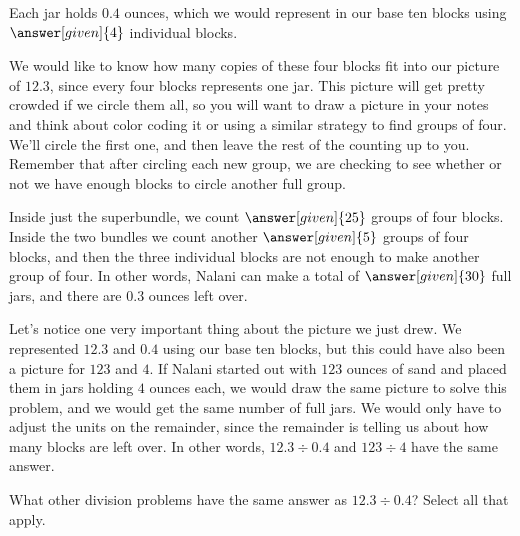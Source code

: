 \documentclass{ximera}
\begin{document}
\begin{example}
\begin{image}
\end{image}
Each jar holds $0.4$ ounces, which we would represent in our base ten blocks using $\answer[given]{4}$ individual blocks.
\begin{image}
\end{image}
We would like to know how many copies of these four blocks fit into our picture of $12.3$, since every four blocks represents one jar. This picture will get pretty crowded if we circle them all, so you will want to draw a picture in your notes and think about color coding it or using a similar strategy to find groups of four. We'll circle the first one, and then leave the rest of the counting up to you. Remember that after circling each new group, we are checking to see whether or not we have enough blocks to circle another full group.
\begin{image}
\end{image}
Inside just the superbundle, we count $\answer[given]{25}$ groups of four blocks. Inside the two bundles we count another $\answer[given]{5}$ groups of four blocks, and then the three individual blocks are not enough to make another group of four. In other words, Nalani can make a total of $\answer[given]{30}$ full jars, and there are $0.3$ ounces left over.

\end{example}

Let's notice one very important thing about the picture we just drew. We represented $12.3$ and $0.4$ using our base ten blocks, but this could have also been a picture for $123$ and $4$. If Nalani started out with $123$ ounces of sand and placed them in jars holding $4$ ounces each, we would draw the same picture to solve this problem, and we would get the same number of full jars. We would only have to adjust the units on the remainder, since the remainder is telling us about how many blocks are left over. In other words, $12.3 \div 0.4$ and $123 \div 4$ have the same answer. 
\begin{question}
What other division problems have the same answer as $12.3 \div 0.4$? Select all that apply.
\begin{selectAll}
\end{selectAll}
\end{question}
\end{document}
